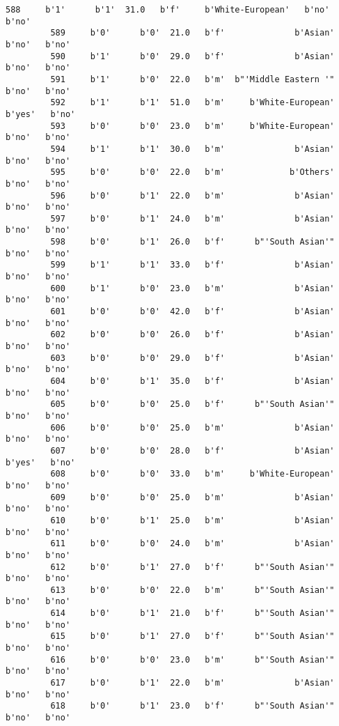 \documentclass[11pt]{article}
\begin{document}
\begin{Verbatim}[commandchars=\\\{\}]
         588     b'1'      b'1'  31.0   b'f'     b'White-European'   b'no'   b'no'   
         589     b'0'      b'0'  21.0   b'f'              b'Asian'   b'no'   b'no'   
         590     b'1'      b'0'  29.0   b'f'              b'Asian'   b'no'   b'no'   
         591     b'1'      b'0'  22.0   b'm'  b"'Middle Eastern '"   b'no'   b'no'   
         592     b'1'      b'1'  51.0   b'm'     b'White-European'  b'yes'   b'no'   
         593     b'0'      b'0'  23.0   b'm'     b'White-European'   b'no'   b'no'   
         594     b'1'      b'1'  30.0   b'm'              b'Asian'   b'no'   b'no'   
         595     b'0'      b'0'  22.0   b'm'             b'Others'   b'no'   b'no'   
         596     b'0'      b'1'  22.0   b'm'              b'Asian'   b'no'   b'no'   
         597     b'0'      b'1'  24.0   b'm'              b'Asian'   b'no'   b'no'   
         598     b'0'      b'1'  26.0   b'f'      b"'South Asian'"   b'no'   b'no'   
         599     b'1'      b'1'  33.0   b'f'              b'Asian'   b'no'   b'no'   
         600     b'1'      b'0'  23.0   b'm'              b'Asian'   b'no'   b'no'   
         601     b'0'      b'0'  42.0   b'f'              b'Asian'   b'no'   b'no'   
         602     b'0'      b'0'  26.0   b'f'              b'Asian'   b'no'   b'no'   
         603     b'0'      b'0'  29.0   b'f'              b'Asian'   b'no'   b'no'   
         604     b'0'      b'1'  35.0   b'f'              b'Asian'   b'no'   b'no'   
         605     b'0'      b'0'  25.0   b'f'      b"'South Asian'"   b'no'   b'no'   
         606     b'0'      b'0'  25.0   b'm'              b'Asian'   b'no'   b'no'   
         607     b'0'      b'0'  28.0   b'f'              b'Asian'  b'yes'   b'no'   
         608     b'0'      b'0'  33.0   b'm'     b'White-European'   b'no'   b'no'   
         609     b'0'      b'0'  25.0   b'm'              b'Asian'   b'no'   b'no'   
         610     b'0'      b'1'  25.0   b'm'              b'Asian'   b'no'   b'no'   
         611     b'0'      b'0'  24.0   b'm'              b'Asian'   b'no'   b'no'   
         612     b'0'      b'1'  27.0   b'f'      b"'South Asian'"   b'no'   b'no'   
         613     b'0'      b'0'  22.0   b'm'      b"'South Asian'"   b'no'   b'no'   
         614     b'0'      b'1'  21.0   b'f'      b"'South Asian'"   b'no'   b'no'   
         615     b'0'      b'1'  27.0   b'f'      b"'South Asian'"   b'no'   b'no'   
         616     b'0'      b'0'  23.0   b'm'      b"'South Asian'"   b'no'   b'no'   
         617     b'0'      b'1'  22.0   b'm'              b'Asian'   b'no'   b'no'   
         618     b'0'      b'1'  23.0   b'f'      b"'South Asian'"   b'no'   b'no'   

\end{Verbatim}
\end{document}

